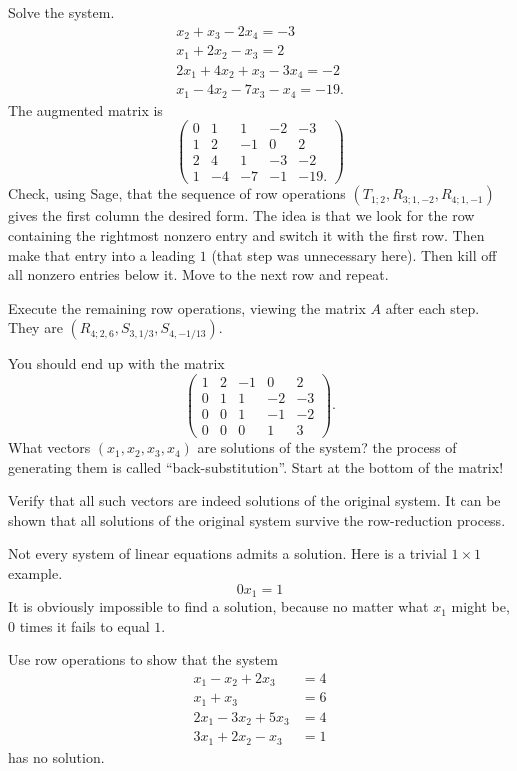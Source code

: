 \documentclass[twocolumn,12pt]{article}
\begin{document}
\begin{example}
    Solve the system.
    \begin{align*}
        x_2 + x_3 - 2x_4 = -3 \\
        x_1 + 2x_2 - x_3 = 2 \\
        2x_1 + 4x_2 + x_3 - 3x_4 = -2 \\
        x_1 - 4x_2 - 7x_3 - x_4 = -19.
    \end{align*}
    The augmented matrix is 
    \[
        \begin{pmatrix}
            0 & 1  & 1  & -2 & -3   \\
            1 & 2  & -1 & 0  & 2    \\
            2 & 4  & 1  & -3 & -2   \\
            1 & -4 & -7 & -1 & -19.
        \end{pmatrix}
    \]
    Check, using Sage, that the sequence of row operations $(T_{1;2}, R_{3;1,-2}, R_{4;1,-1})$ gives the first column the desired form. The idea is that we look for the row containing the rightmost nonzero entry and switch it with the first row. Then make that entry into a leading $1$ (that step was unnecessary here). Then kill off all nonzero entries below it. Move to the next row and repeat.

    Execute the remaining row operations, viewing the matrix $A$ after each step. They are $(R_{4;2,6}, S_{3,1/3}, S_{4,-1/13})$.

    You should end up with the matrix
    \[
        \begin{pmatrix}
            1 & 2 & -1 & 0 & 2 \\
            0 & 1 & 1 & -2 & -3 \\
            0 & 0 & 1 & -1 & -2 \\
            0 & 0 & 0 & 1 & 3
        \end{pmatrix}.
    \]
    What vectors $(x_1, x_2, x_3, x_4)$ are solutions of the system? the process of generating them is called ``back-substitution''. Start at the bottom of the matrix! 

    Verify that all such vectors are indeed solutions of the original system. It can be shown that all solutions of the original system survive the row-reduction process.
\end{example}
Not every system of linear equations admits a solution. Here is a trivial $1 \times 1$ example.
\[
    0x_1 = 1
\]
It is obviously impossible to find a solution, because no matter what $x_1$ might be, $0$ times it fails to equal $1$.
\begin{example}
    Use row operations to show that the system
    \begin{align*}
        x_1 - x_2 + 2x_3 &= 4 \\             
        x_1 + x_3 &= 6 \\
        2x_1 - 3x_2 + 5x_3 &= 4 \\
        3x_1 + 2x_2 - x_3 &= 1
    \end{align*}
    has no solution.
\end{example}
\end{document}
